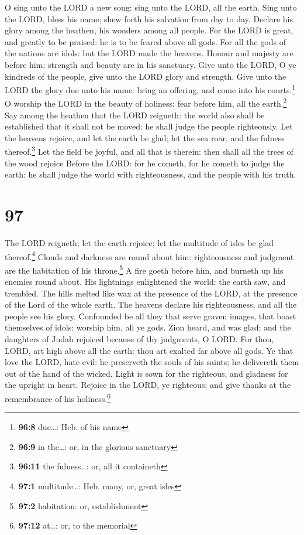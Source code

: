  O sing unto the LORD a new song: sing unto the LORD, all
the earth.  Sing unto the LORD, bless his name; shew forth
his salvation from day to day.  Declare his glory among
the heathen, his wonders among all people.  For the LORD
is great, and greatly to be praised: he is to be feared above all gods.
 For all the gods of the nations are idols: but the LORD
made the heavens.  Honour and majesty are before him:
strength and beauty are in his sanctuary.  Give unto the
LORD, O ye kindreds of the people, give unto the LORD glory and
strength.  Give unto the LORD the glory due unto his name:
bring an offering, and come into his courts.\footnote{\textbf{96:8}
  due\ldots: Heb. of his name}  O worship the LORD in the
beauty of holiness: fear before him, all the earth.\footnote{\textbf{96:9}
  in the\ldots: or, in the glorious sanctuary}  Say among
the heathen that the LORD reigneth: the world also shall be established
that it shall not be moved: he shall judge the people righteously.
 Let the heavens rejoice, and let the earth be glad; let
the sea roar, and the fulness thereof.\footnote{\textbf{96:11} the
  fulness\ldots: or, all it containeth}  Let the field be
joyful, and all that is therein: then shall all the trees of the wood
rejoice  Before the LORD: for he cometh, for he cometh to
judge the earth: he shall judge the world with righteousness, and the
people with his truth.

\hypertarget{section-96}{%
\section{97}\label{section-96}}

 The LORD reigneth; let the earth rejoice; let the
multitude of isles be glad thereof.\footnote{\textbf{97:1}
  multitude\ldots: Heb. many, or, great isles}  Clouds and
darkness are round about him: righteousness and judgment are the
habitation of his throne.\footnote{\textbf{97:2} habitation: or,
  establishment}  A fire goeth before him, and burneth up
his enemies round about.  His lightnings enlightened the
world: the earth saw, and trembled.  The hills melted like
wax at the presence of the LORD, at the presence of the Lord of the
whole earth.  The heavens declare his righteousness, and
all the people see his glory.  Confounded be all they that
serve graven images, that boast themselves of idols: worship him, all ye
gods.  Zion heard, and was glad; and the daughters of
Judah rejoiced because of thy judgments, O LORD.  For
thou, LORD, art high above all the earth: thou art exalted far above all
gods.  Ye that love the LORD, hate evil: he preserveth
the souls of his saints; he delivereth them out of the hand of the
wicked.  Light is sown for the righteous, and gladness
for the upright in heart.  Rejoice in the LORD, ye
righteous; and give thanks at the remembrance of his
holiness.\footnote{\textbf{97:12} at\ldots: or, to the memorial}

